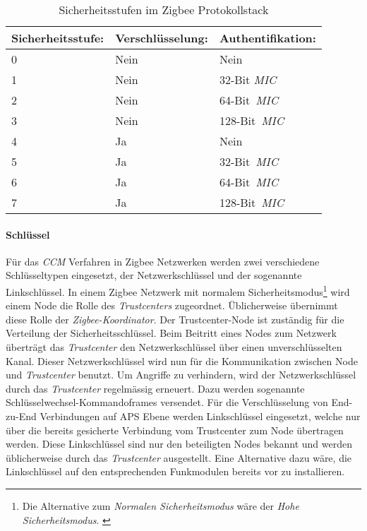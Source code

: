 \begin{table}[h]
\centering
\begin{tabular}{lll} 
\toprule
Sicherheitsstufe: & Verschlüsselung: & Authentifikation: \\ 
\hline
0 & Nein & Nein \\
1 & Nein & 32-Bit \textit{MIC} \\
2 & Nein & 64-Bit~\textit{MIC} \\
3 & Nein & 128-Bit~\textit{MIC} \\
4 & Ja & Nein \\
5 & Ja & 32-Bit~\textit{MIC} \\
6 & Ja & 64-Bit~\textit{MIC} \\
7 & Ja & 128-Bit~\textit{MIC} \\
\bottomrule
\end{tabular}
\caption{Sicherheitsstufen im Zigbee Protokollstack \cite[S.~334]{markus_krause_rainer_konrad_zigbee_2014}}
\label{tab:SicherheitsstufeninZigbee}
\end{table}

\paragraph{Schlüssel}
Für das \textit{CCM} Verfahren in Zigbee Netzwerken werden zwei verschiedene Schlüsseltypen eingesetzt, der Netzwerkschlüssel und der sogenannte Linkschlüssel.
In einem Zigbee Netzwerk mit normalem Sicherheitsmodus\footnote{Die Alternative zum \textit{Normalen Sicherheitsmodus} wäre der \textit{Hohe Sicherheitsmodus}. \cite[S.~338]{markus_krause_rainer_konrad_zigbee_2014}} wird einem Node die Rolle des \textit{Trustcenters} zugeordnet.
Üblicherweise übernimmt diese Rolle der \textit{Zigbee-Koordinator}.
Der Trustcenter-Node ist zuständig für die Verteilung der Sicherheitsschlüssel.
Beim Beitritt eines Nodes zum Netzwerk überträgt das \textit{Trustcenter} den Netzwerkschlüssel über einen unverschlüsselten Kanal.
Dieser Netzwerkschlüssel wird nun für die Kommunikation zwischen Node und \textit{Trustcenter} benutzt.
Um Angriffe zu verhindern, wird der Netzwerkschlüssel durch das \textit{Trustcenter} regelmässig erneuert.
Dazu werden sogenannte Schlüsselwechsel-Kommandoframes versendet.
Für die Verschlüsselung von End-zu-End Verbindungen auf APS Ebene werden Linkschlüssel eingesetzt, welche nur über die bereits gesicherte Verbindung vom Trustcenter zum Node übertragen werden.
Diese Linkschlüssel sind nur den beteiligten Nodes bekannt und werden üblicherweise durch das \textit{Trustcenter} ausgestellt.
Eine Alternative dazu wäre, die Linkschlüssel auf den entsprechenden Funkmodulen bereits vor zu installieren.


